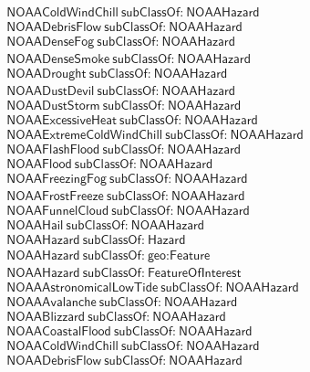 \begin{align}
  \textsf{NOAAColdWindChill}~\textsf{subClassOf:}~\textsf{NOAAHazard}\\
  \textsf{NOAADebrisFlow}~\textsf{subClassOf:}~\textsf{NOAAHazard}\\
  \textsf{NOAADenseFog}~\textsf{subClassOf:}~\textsf{NOAAHazard}\\
  \textsf{NOAADenseSmoke}~\textsf{subClassOf:}~\textsf{NOAAHazard}\\
  \textsf{NOAADrought}~\textsf{subClassOf:}~\textsf{NOAAHazard}\\
  \textsf{NOAADustDevil}~\textsf{subClassOf:}~\textsf{NOAAHazard}\\
  \textsf{NOAADustStorm}~\textsf{subClassOf:}~\textsf{NOAAHazard}\\
  \textsf{NOAAExcessiveHeat}~\textsf{subClassOf:}~\textsf{NOAAHazard}\\
  \textsf{NOAAExtremeColdWindChill}~\textsf{subClassOf:}~\textsf{NOAAHazard}\\
  \textsf{NOAAFlashFlood}~\textsf{subClassOf:}~\textsf{NOAAHazard}\\
  \textsf{NOAAFlood}~\textsf{subClassOf:}~\textsf{NOAAHazard}\\
  \textsf{NOAAFreezingFog}~\textsf{subClassOf:}~\textsf{NOAAHazard}\\
  \textsf{NOAAFrostFreeze}~\textsf{subClassOf:}~\textsf{NOAAHazard}\\
  \textsf{NOAAFunnelCloud}~\textsf{subClassOf:}~\textsf{NOAAHazard}\\
  \textsf{NOAAHail}~\textsf{subClassOf:}~\textsf{NOAAHazard}\\
  \textsf{NOAAHazard}~\textsf{subClassOf:}~\textsf{Hazard}\\
  \textsf{NOAAHazard}~\textsf{subClassOf:}~\textsf{geo:Feature}\\
  \textsf{NOAAHazard}~\textsf{subClassOf:}~\textsf{FeatureOfInterest}\\
  \textsf{NOAAAstronomicalLowTide}~\textsf{subClassOf:}~\textsf{NOAAHazard}\\
  \textsf{NOAAAvalanche}~\textsf{subClassOf:}~\textsf{NOAAHazard}\\
  \textsf{NOAABlizzard}~\textsf{subClassOf:}~\textsf{NOAAHazard}\\
  \textsf{NOAACoastalFlood}~\textsf{subClassOf:}~\textsf{NOAAHazard}\\
  \textsf{NOAAColdWindChill}~\textsf{subClassOf:}~\textsf{NOAAHazard}\\
  \textsf{NOAADebrisFlow}~\textsf{subClassOf:}~\textsf{NOAAHazard}\\

\end{align}
